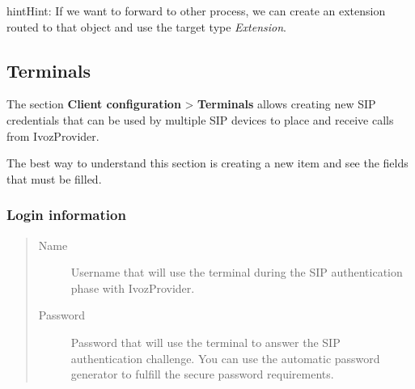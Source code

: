 \documentclass[letterpaper,10pt,english]{sphinxmanual}
\begin{document}
\begin{notice}{hint}{Hint:}
If we want to forward to other process, we can create an extension
routed to that object and use the target type \emph{Extension}.
\end{notice}


\subsection{Terminals}
\label{administration_portal/client/vpbx/terminals:terminals}\label{administration_portal/client/vpbx/terminals::doc}\label{administration_portal/client/vpbx/terminals:id1}
The section \textbf{Client configuration} \textgreater{} \textbf{Terminals} allows creating new
SIP credentials that can be used by multiple SIP devices to place and receive
calls from IvozProvider.

The best way to understand this section is creating a new item and see the
fields that must be filled.


\subsubsection{Login information}
\label{administration_portal/client/vpbx/terminals:login-information}\begin{quote}
\begin{description}
\item[{Name}] \leavevmode
Username that will use the terminal during the SIP authentication phase
with IvozProvider.

\item[{Password}] \leavevmode
Password that will use the terminal to answer the SIP authentication
challenge. You can use the automatic password generator to fulfill the
secure password requirements.

\end{description}
\end{quote}
\end{document}
